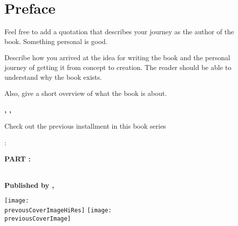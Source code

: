 

\chapter{Preface}
\label{preface:cha}

\begin{myquotation}
Feel free to add a quotation that describes your journey as the author of the book. Something personal is good.\end{myquotation}

Describe how you arrived at the idea for writing the book and the personal journey of getting it from concept to creation. The reader should be able to understand why the book exists.

Also, give a short overview of what the book is about.

\noindent \textbf{\yourName}

\textbf{\yourCity, \yourCountry, \prefaceDate}



\hfil{}\hfil

\ifseries

\begin{center}

Check out the previous installment in this book series \bfseries \sffamily \LARGE \titleOfTheBookSeries\par:

\bfseries \Large PART \partPreviousPart: \titlePreviousPart\par
{}

~\\
\bfseries \small Published by \mypublishingcompany, \mypublishingcompanylocation\par

\ifxetex
    \texttt{[image: \\prevousCoverImageHiRes]}
\else
    \texttt{[image: \\previousCoverImage]}
\fi
\end{center}
\fi
